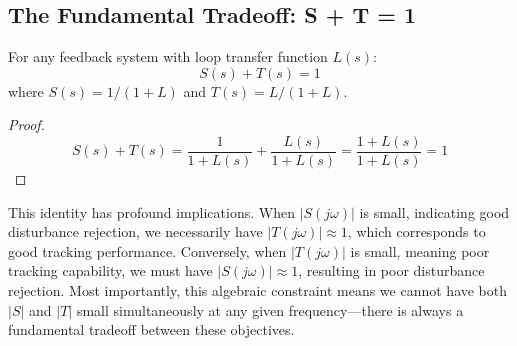 \subsection{The Fundamental Tradeoff: S + T = 1}

\begin{theorem}
For any feedback system with loop transfer function $L(s)$:
\begin{equation}
S(s) + T(s) = 1
\label{eq:s_plus_t}
\end{equation}
where $S(s) = 1/(1+L)$ and $T(s) = L/(1+L)$.
\end{theorem}

\begin{proof}
\begin{equation}
S(s) + T(s) = \frac{1}{1+L(s)} + \frac{L(s)}{1+L(s)} = \frac{1 + L(s)}{1 + L(s)} = 1
\end{equation}
\end{proof}

This identity has profound implications. When $|S(j\omega)|$ is small, indicating good disturbance rejection, we necessarily have $|T(j\omega)| \approx 1$, which corresponds to good tracking performance. Conversely, when $|T(j\omega)|$ is small, meaning poor tracking capability, we must have $|S(j\omega)| \approx 1$, resulting in poor disturbance rejection. Most importantly, this algebraic constraint means we cannot have both $|S|$ and $|T|$ small simultaneously at any given frequency---there is always a fundamental tradeoff between these objectives.


